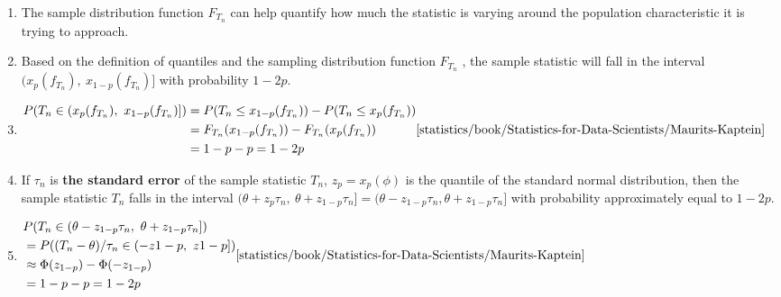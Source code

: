 \begin{enumerate}
    \item The sample distribution function $F_{T_n}$ can help quantify how much the statistic is varying around the population characteristic it is trying to approach.
    \hfill \cite{statistics/book/Statistics-for-Data-Scientists/Maurits-Kaptein}

    \item Based on the definition of quantiles and the sampling distribution function $F_{T_n}$ , the sample statistic will fall in the interval $(x _p ( f _{T_n} ),\ x_{1- p} ( f _{T_n} )]$ with probability $1 - 2 p$.
    \hfill \cite{statistics/book/Statistics-for-Data-Scientists/Maurits-Kaptein}

    \item
    $
        \begin{aligned}
            P(T_n \in (x_ p ( f _{T_n} ),\ x_{1- p} ( f _{T_n} )])
            &= P(T_n \leq  x_{1- p} ( f _{T_n} )) - P(T_n \leq  x_ p ( f _{T_n} )) \\
            &= F_{T_n} (x_{1- p} ( f _{T_n} )) - F_{T_n} (x _p ( f _{T_n} )) \\
            &= 1 - p - p = 1 - 2 p
        \end{aligned}
        \hfill \text{\cite{statistics/book/Statistics-for-Data-Scientists/Maurits-Kaptein}}
    $

    \item If $\tau_n$ is \textbf{the standard error} of the sample statistic $T_n$, $z _p = x _p (\phi)$ is the quantile of the standard normal distribution, then the sample statistic $T_n$ falls in the interval $(\theta  + z _p \tau_ n ,\ \theta  + z_{1- p} \tau _n ] = (\theta  - z_{1- p} \tau _n , \theta  + z_{1- p} \tau_ n ]$ with probability approximately equal to $1 - 2 p$.
    \hfill \cite{statistics/book/Statistics-for-Data-Scientists/Maurits-Kaptein}

    \item
    $
        \begin{aligned}
            &P(T_n \in  (\theta  - z_{1- p} \tau_n ,\ \theta  + z_{1- p} \tau_n ]) \\
            &= P((T_n - \theta )/\tau_n \in  (-z{1- p} ,\ z{1- p} ]) \\
            &\approx \Phi(z_{1- p} ) - \Phi(-z_{1- p} ) \\
            &= 1 - p - p
            = 1 - 2 p
        \end{aligned}
        \hfill \text{\cite{statistics/book/Statistics-for-Data-Scientists/Maurits-Kaptein}}
    $


\end{enumerate}
